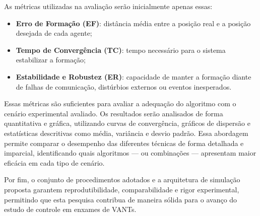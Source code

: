 As métricas utilizadas na avaliação serão inicialmente apenas essas:

\begin{itemize}
    \item \textbf{Erro de Formação (EF)}: distância média entre a posição real e a posição desejada de cada agente;
    \item \textbf{Tempo de Convergência (TC)}: tempo necessário para o sistema estabilizar a formação;
    \item \textbf{Estabilidade e Robustez (ER)}: capacidade de manter a formação diante de falhas de comunicação, distúrbios externos ou eventos inesperados.
\end{itemize}

Essas métricas são suficientes para avaliar a adequação do algoritmo com o cenário experimental avaliado. Os resultados serão analisados de forma quantitativa e gráfica, utilizando curvas de convergência, gráficos de dispersão e estatísticas descritivas como média, variância e desvio padrão. Essa abordagem permite comparar o desempenho das diferentes técnicas de forma detalhada e imparcial, identificando quais algoritmos — ou combinações — apresentam maior eficácia em cada tipo de cenário.

Por fim, o conjunto de procedimentos adotados e a arquitetura de simulação proposta garantem reprodutibilidade, comparabilidade e rigor experimental, permitindo que esta pesquisa contribua de maneira sólida para o avanço do estudo de controle em enxames de VANTs.


